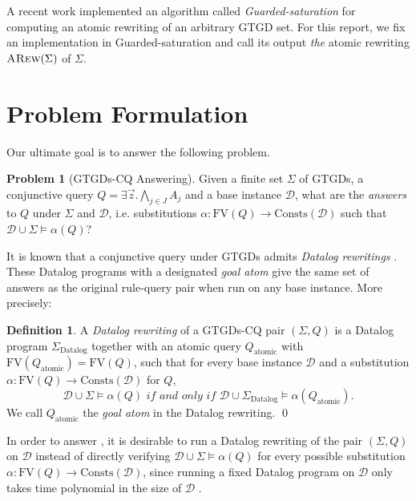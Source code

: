 \documentclass[12pt]{report}
\theoremstyle{plain}
\theoremstyle{definition}
\newtheorem{problem}[theorem]{Problem}
\newtheorem{definition}[theorem]{Definition}
\def\FV{{\mathrm{FV}}}
\def\Consts{{\mathrm{Consts}}}
\newcommand{\ARew}[1]{\ensuremath{\normalfont{\textsc{ARew}}\!\left( #1 \right)}}
\begin{document}
A recent work \cite{benedikt_buron_germano_kappelmann_motik_2022} implemented an algorithm called \emph{Guarded-saturation} for computing an atomic rewriting of an arbitrary GTGD set. For this report, we fix an implementation in Guarded-saturation and call its output \emph{the} atomic rewriting $\ARew{\Sigma}$ of $\Sigma$.

\section{Problem Formulation}

Our ultimate goal is to answer the following problem.

\begin{problem}[GTGDs-CQ Answering]
\label{problem:GTGDs-CQ-Answering}
  Given a finite set $\Sigma$ of GTGDs, a conjunctive query $Q = \exists \vec{z}. \bigwedge_{j \in J} A_j$ and a base instance $\mathcal{D}$, what are the \emph{answers} to $Q$ under $\Sigma$ and $\mathcal{D}$, i.e. substitutions $\alpha: \FV(Q) \rightarrow \Consts(\mathcal{D})$ such that $\mathcal{D} \cup \Sigma \models \alpha(Q)$?
\end{problem}

It is known that a conjunctive query under GTGDs admits \emph{Datalog rewritings} \cite{barany_benedikt_cate_2013}. These Datalog programs with a designated \emph{goal atom} give the same set of answers as the original rule-query pair when run on any base instance. More precisely:

\begin{definition}
  A \emph{Datalog rewriting} of a GTGDs-CQ pair $(\Sigma, Q)$ is a Datalog program $\Sigma_\mathrm{Datalog}$ together with an atomic query $Q_\mathrm{atomic}$ with $\FV(Q_\mathrm{atomic}) = \FV(Q)$, such that for every base instance $\mathcal{D}$ and a substitution $\alpha: \FV(Q) \rightarrow \Consts(\mathcal{D})$ for $Q$, $$\mathcal{D} \cup \Sigma \models \alpha(Q) \textit{ if and only if } \mathcal{D} \cup \Sigma_\mathrm{Datalog} \models \alpha(Q_\mathrm{atomic}).$$
  We call $Q_\mathrm{atomic}$ the \emph{goal atom} in the Datalog rewriting.
  \qed
\end{definition}

In order to answer , it is desirable to run a Datalog rewriting of the pair $(\Sigma, Q)$ on $\mathcal{D}$ instead of directly verifying $\mathcal{D} \cup \Sigma \models \alpha(Q)$ for every possible substitution $\alpha: \FV(Q) \rightarrow \Consts(\mathcal{D})$, since running a fixed Datalog program on $\mathcal{D}$ only takes time polynomial in the size of $\mathcal{D}$ \cite{dantsin_eiter_gottlob_voronkov_2001}.
\end{document}
